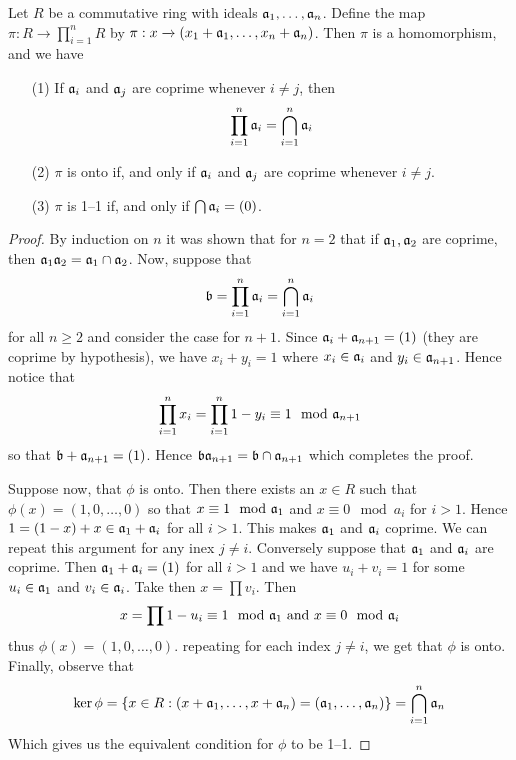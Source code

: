 \begin{theorem}\label{theorem_5.5.10}
  Let $R$ be a commutative ring with ideals $\mathfrak{a}_1, \dots, \mathfrak{a}_n$. Define the
  map $\pi:R \xrightarrow{} \prod_{i=1}^n{R}$ by $\pi:x \xrightarrow{}
  (x_1+\mathfrak{a}_1, \dots, x_n+\mathfrak{a}_n)$. Then $\pi$ is a homomorphism, and we have
  \begin{enumerate}
    \item[(1)] If $\mathfrak{a}_i$ and  $\mathfrak{a}_j$ are coprime whenever $i \neq j$, then
      \begin{equation*}
        \prod_{i=1}^n{\mathfrak{a}_i}=\bigcap_{i=1}^n{\mathfrak{a}_i}
      \end{equation*}

    \item[(2)] $\pi$ is onto if, and only if $\mathfrak{a}_i$ and $\mathfrak{a}_j$ are coprime
      whenever  $i \neq j$.

    \item[(3)] $\pi$ is 1--1 if, and only if  $\bigcap{\mathfrak{a}_i}=(0)$.
  \end{enumerate}
\end{theorem}
\begin{proof}
  By induction on $n$ it was shown that for $n=2$ that if $\mathfrak{a}_1,\mathfrak{a}_2$ are
  coprime, then $\mathfrak{a}_1\mathfrak{a}_2=\mathfrak{a}_1 \cap \mathfrak{a}_2$. Now, suppose that
  \begin{equation*}
    \mathfrak{b}=\prod_{i=1}^n{\mathfrak{a}_i}=\bigcap_{i=1}^n{\mathfrak{a}_i}
  \end{equation*}
  for all $n \geq 2$ and consider the case for $n+1$. Since
  $\mathfrak{a}_i+\mathfrak{a}_{n+1}=(1)$ (they are coprime by hypothesis), we have $x_i+y_i=1$
  where  $x_i \in \mathfrak{a}_i$ and  $y_i \in \mathfrak{a}_{n+1}$. Hence notice that
  \begin{equation*}
    \prod_{i=1}^n{x_i}=\prod_{i=1}^n{1-y_i} \equiv 1 \mod{\mathfrak{a}_{n+1}}
  \end{equation*}
  so that $\mathfrak{b}+\mathfrak{a}_{n+1}=(1)$. Hence $\mathfrak{b}\mathfrak{a}_{n+1}=\mathfrak{b} \cap \mathfrak{a}_{n+1}$ which
  completes the proof.

  Suppose now, that $\phi$ is onto. Then there exists an  $x \in R$ such that
  $\phi(x)=(1,0, \dots, 0)$ so that $x \equiv 1 \mod{\mathfrak{a}_1}$ and $x \equiv 0
  \mod{a_i}$ for $i>1$. Hence  $1=(1-x)+x \in \mathfrak{a}_1+\mathfrak{a}_i$ for all $i>1$.
  This makes  $\mathfrak{a}_1$ and $\mathfrak{a}_i$ coprime. We can repeat this argument for
  any inex  $j \neq i$. Conversely suppose that $\mathfrak{a}_1$ and $\mathfrak{a}_i$ are
  coprime. Then $\mathfrak{a}_1+\mathfrak{a}_i=(1)$ for all $i>1$ and we have  $u_i+v_i=1$ for
  some  $u_i \in \mathfrak{a}_1$ and $v_i \in \mathfrak{a}_i$. Take then  $x=\prod{v_i}$. Then
  \begin{equation*}
    x=\prod{1-u_i} \equiv 1 \mod{\mathfrak{a}_1} \text{ and } x \equiv 0 \mod{\mathfrak{a}_i}
  \end{equation*}
  thus $\phi(x)=(1,0, \dots, 0)$. repeating for each index $j \neq i$, we get
  that  $\phi$ is onto. Finally, observe that
  \begin{equation*}
    \ker{\phi}=\{x \in R : (x+\mathfrak{a}_1, \dots,x+\mathfrak{a}_n)=(\mathfrak{a}_1, \dots, \mathfrak{a}_n)\}=
    \bigcap_{i=1}^n{\mathfrak{a}_n}
  \end{equation*}
  Which gives us the equivalent condition for $\phi$ to be 1--1.
\end{proof}

